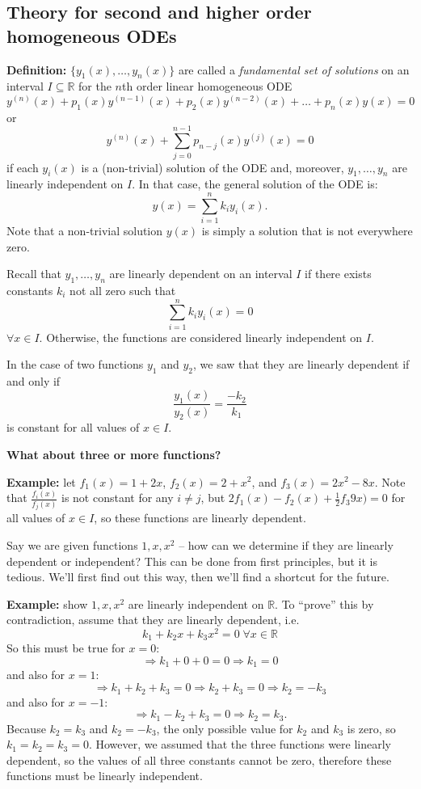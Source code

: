 \documentclass[11pt]{article}
\newcommand{\example}{\textbf{Example: }}
\newcommand{\definition}{\textbf{Definition: }}
\begin{document}
\subsection{Theory for second and higher order homogeneous ODEs}
	\definition $\{y_1 (x), \ldots, y_n (x)\}$ are called a \emph{fundamental set of solutions} on an interval $I \subseteq \mathbb{R}$ for the $n$th order linear homogeneous ODE
		$$ y^{(n)}(x) + p_1 (x) y^{(n-1)} (x) + p_2 (x) y^{(n-2)} (x) + \ldots + p_n (x) y (x) = 0 $$
	or
		$$ y^{(n)}(x) + \sum_{j = 0}^{n-1} p_{n-j}(x) y^{(j)} (x) = 0 $$
	if each $y_i(x)$ is a (non-trivial) solution of the ODE and, moreover, $y_1, \ldots, y_n$ are linearly independent on $I$. In that case, the general solution of the ODE is:
		$$ y(x) = \sum_{i = 1}^n k_i y_i (x). $$
	Note that a non-trivial solution $y(x)$ is simply a solution that is not everywhere zero.

	Recall that $y_1, \ldots, y_n$ are linearly dependent on an interval $I$ if there exists constants $k_i$ not all zero such that
		$$ \sum_{i=1}^n k_i y_i (x) = 0 $$
	$\forall x \in I$. Otherwise, the functions are considered linearly independent on $I$.

	In the case of two functions $y_1$ and $y_2$, we saw that they are linearly dependent if and only if
		$$ \frac{y_1 (x)}{y_2 (x)} = \frac{-k_2}{k_1} $$
	is constant for all values of $x \in I$.

	\textbf{What about three or more functions?}

	\example let $f_1 (x) = 1 + 2x$, $f_2 (x) = 2 + x^2$, and $f_3 (x) = 2x^2 - 8x$. Note that $\frac{f_i(x)}{f_j(x)}$ is not constant for any $i \neq j$, but $2 f_1 (x) - f_2 (x) + \frac{1}{2} f_3 9x) = 0$ for all values of $x \in I$, so these functions are linearly dependent.

	Say we are given functions $1, x, x^2$ -- how can we determine if they are linearly dependent or independent? This can be done from first principles, but it is tedious. We'll first find out this way, then we'll find a shortcut for the future.

	\example show $1, x, x^2$ are linearly independent on $\mathbb{R}$. To ``prove'' this by contradiction, assume that they are linearly dependent, i.e.
		$$ k_1 + k_2 x + k_3 x^2 = 0 \; \forall x \in \mathbb{R} $$
	So this must be true for $x = 0$:
		$$ \Rightarrow k_1 + 0 + 0 = 0 \Rightarrow k_1 = 0 $$
	and also for $x = 1$:
		$$ \Rightarrow k_1 + k_2 + k_3 = 0 \Rightarrow k_2 + k_3 = 0 \Rightarrow k_2 = - k_3$$
	and also for $x = -1$:
		$$ \Rightarrow k_1 - k_2 + k_3 = 0 \Rightarrow k_2 = k_3. $$
	Because $k_2 = k_3$ and $k_2 = - k_3$, the only possible value for $k_2$ and $k_3$ is zero, so $k_1 = k_2 = k_3 = 0$. However, we assumed that the three functions were linearly dependent, so the values of all three constants cannot be zero, therefore these functions must be linearly independent.
\end{document}
